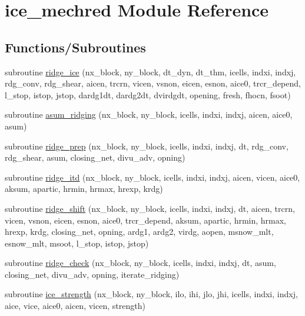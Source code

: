 \hypertarget{namespaceice__mechred}{
\section{ice\_\-mechred Module Reference}
\label{namespaceice__mechred}
}
\subsection*{Functions/Subroutines}
\begin{DoxyCompactItemize}
\item 
subroutine \hyperlink{namespaceice__mechred_a22ae992e7f20fe021992af92a29f81e1}{ridge\_\-ice} (nx\_\-block, ny\_\-block, dt\_\-dyn, dt\_\-thm, icells, indxi, indxj, rdg\_\-conv, rdg\_\-shear, aicen, trcrn, vicen, vsnon, eicen, esnon, aice0, trcr\_\-depend, l\_\-stop, istop, jstop, dardg1dt, dardg2dt, dvirdgdt, opening, fresh, fhocn, fsoot)
\item 
subroutine \hyperlink{namespaceice__mechred_a0b56099ad3d0f301b3dfaab8aba87ef4}{asum\_\-ridging} (nx\_\-block, ny\_\-block, icells, indxi, indxj, aicen, aice0, asum)
\item 
subroutine \hyperlink{namespaceice__mechred_a387bb4361bc395e2cc8d9ab50ef03728}{ridge\_\-prep} (nx\_\-block, ny\_\-block, icells, indxi, indxj, dt, rdg\_\-conv, rdg\_\-shear, asum, closing\_\-net, divu\_\-adv, opning)
\item 
subroutine \hyperlink{namespaceice__mechred_aa337d7f3df7eb6c6f9e3724e2d350e0c}{ridge\_\-itd} (nx\_\-block, ny\_\-block, icells, indxi, indxj, aicen, vicen, aice0, aksum, apartic, hrmin, hrmax, hrexp, krdg)
\item 
subroutine \hyperlink{namespaceice__mechred_ad5b2abaa36fa52ab9a96420dbf8d48cc}{ridge\_\-shift} (nx\_\-block, ny\_\-block, icells, indxi, indxj, dt, aicen, trcrn, vicen, vsnon, eicen, esnon, aice0, trcr\_\-depend, aksum, apartic, hrmin, hrmax, hrexp, krdg, closing\_\-net, opning, ardg1, ardg2, virdg, aopen, msnow\_\-mlt, esnow\_\-mlt, msoot, l\_\-stop, istop, jstop)
\item 
subroutine \hyperlink{namespaceice__mechred_af7cf08ba4d3da94152517c6058b2f219}{ridge\_\-check} (nx\_\-block, ny\_\-block, icells, indxi, indxj, dt, asum, closing\_\-net, divu\_\-adv, opning, iterate\_\-ridging)
\item 
subroutine \hyperlink{namespaceice__mechred_a11d0a7efe6faca932079c613d5a7fdb7}{ice\_\-strength} (nx\_\-block, ny\_\-block, ilo, ihi, jlo, jhi, icells, indxi, indxj, aice, vice, aice0, aicen, vicen, strength)
\end{DoxyCompactItemize}
